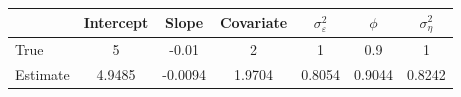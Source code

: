 \begin{tabular}{lcccccc}
\toprule
& Intercept & Slope & Covariate & $\sigma_\varepsilon^2$ & $\phi$ & $\sigma_\eta^2$ \\
\midrule
True & 5 & -0.01 & 2 & 1 & 0.9 & 1 \\
Estimate & 4.9485 & -0.0094 & 1.9704 & 0.8054 & 0.9044 & 0.8242 \\
\bottomrule
\end{tabular}
